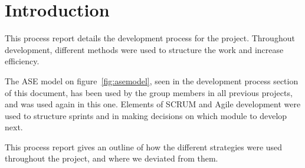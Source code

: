 \chapter{Introduction}
This process report details the development process for the project. Throughout development, different methods were used to structure the work and increase efficiency. 

The ASE model on figure~\ref{fig:asemodel}, seen in the development process section of this document, has been used by the group members in all previous projects, and was used again in this one. Elements of SCRUM and Agile development were used to structure sprints and in making decisions on which module to develop next. 

This process report gives an outline of how the different strategies were used throughout the project, and where we deviated from them.

